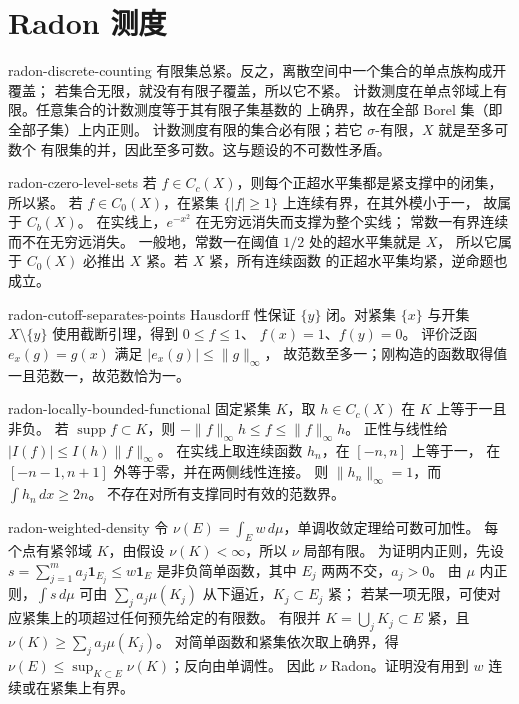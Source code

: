 \chapter{Radon 测度}

\begin{solution}{radon-discrete-counting}
有限集总紧。反之，离散空间中一个集合的单点族构成开覆盖；
若集合无限，就没有有限子覆盖，所以它不紧。
计数测度在单点邻域上有限。任意集合的计数测度等于其有限子集基数的
上确界，故在全部 Borel 集（即全部子集）上内正则。
计数测度有限的集合必有限；若它 \(\sigma\)-有限，\(X\) 就是至多可数个
有限集的并，因此至多可数。这与题设的不可数性矛盾。
\end{solution}

\begin{solution}{radon-czero-level-sets}
若 \(f\in C_c(X)\)，则每个正超水平集都是紧支撑中的闭集，所以紧。
若 \(f\in C_0(X)\)，在紧集 \(\{|f|\ge1\}\) 上连续有界，在其外模小于一，
故属于 \(C_b(X)\)。
在实线上，\(e^{-x^2}\) 在无穷远消失而支撑为整个实线；
常数一有界连续而不在无穷远消失。
一般地，常数一在阈值 \(1/2\) 处的超水平集就是 \(X\)，
所以它属于 \(C_0(X)\) 必推出 \(X\) 紧。若 \(X\) 紧，所有连续函数
的正超水平集均紧，逆命题也成立。
\end{solution}

\begin{solution}{radon-cutoff-separates-points}
Hausdorff 性保证 \(\{y\}\) 闭。对紧集 \(\{x\}\) 与开集
\(X\setminus\{y\}\) 使用截断引理，得到 \(0\le f\le1\)、
\(f(x)=1\)、\(f(y)=0\)。
评价泛函 \(e_x(g)=g(x)\) 满足 \(|e_x(g)|\le\|g\|_\infty\)，
故范数至多一；刚构造的函数取得值一且范数一，故范数恰为一。
\end{solution}

\begin{solution}{radon-locally-bounded-functional}
固定紧集 \(K\)，取 \(h\in C_c(X)\) 在 \(K\) 上等于一且非负。
若 \(\operatorname{supp}f\subset K\)，则
\(-\|f\|_\infty h\le f\le\|f\|_\infty h\)。
正性与线性给 \(|I(f)|\le I(h)\|f\|_\infty\)。
在实线上取连续函数 \(h_n\)，在 \([-n,n]\) 上等于一，
在 \([-n-1,n+1]\) 外等于零，并在两侧线性连接。
则 \(\|h_n\|_\infty=1\)，而 \(\int h_n\,dx\ge2n\)。
不存在对所有支撑同时有效的范数界。
\end{solution}

\begin{solution}{radon-weighted-density}
令 \(\nu(E)=\int_Ew\,d\mu\)，单调收敛定理给可数可加性。
每个点有紧邻域 \(K\)，由假设 \(\nu(K)<\infty\)，所以 \(\nu\) 局部有限。
为证明内正则，先设 \(s=\sum_{j=1}^m a_j\mathbf1_{E_j}\le w\mathbf1_E\)
是非负简单函数，其中 \(E_j\) 两两不交，\(a_j>0\)。
由 \(\mu\) 内正则，\(\int s\,d\mu\) 可由
\(\sum_j a_j\mu(K_j)\) 从下逼近，\(K_j\subset E_j\) 紧；
若某一项无限，可使对应紧集上的项超过任何预先给定的有限数。
有限并 \(K=\bigcup_jK_j\subset E\) 紧，且
\(\nu(K)\ge\sum_j a_j\mu(K_j)\)。
对简单函数和紧集依次取上确界，得
\(\nu(E)\le\sup_{K\subset E}\nu(K)\)；反向由单调性。
因此 \(\nu\) Radon。证明没有用到 \(w\) 连续或在紧集上有界。
\end{solution}

